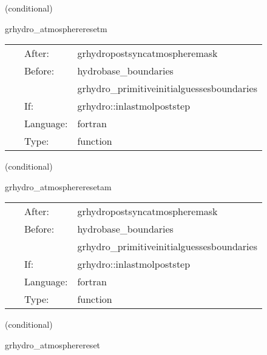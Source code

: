 \documentclass{article}
\begin{document}
   (conditional) 

\hspace{5mm} grhydro\_atmosphereresetm 

\hspace{5mm}{\it reset the atmosphere - mhd version } 


\hspace{5mm}

 \begin{tabular*}{160mm}{cll} 
~ & After:  & grhydropostsyncatmospheremask \\ 
~ & Before:  & hydrobase\_boundaries \\ 
~& ~ &grhydro\_primitiveinitialguessesboundaries\\ 
~ & If:  & grhydro::inlastmolpoststep \\ 
~ & Language:  & fortran \\ 
~ & Type:  & function \\ 
\end{tabular*} 


\vspace{5mm}

   (conditional) 

\hspace{5mm} grhydro\_atmosphereresetam 

\hspace{5mm}{\it reset the atmosphere - mhd with avec version } 


\hspace{5mm}

 \begin{tabular*}{160mm}{cll} 
~ & After:  & grhydropostsyncatmospheremask \\ 
~ & Before:  & hydrobase\_boundaries \\ 
~& ~ &grhydro\_primitiveinitialguessesboundaries\\ 
~ & If:  & grhydro::inlastmolpoststep \\ 
~ & Language:  & fortran \\ 
~ & Type:  & function \\ 
\end{tabular*} 


\vspace{5mm}

   (conditional) 

\hspace{5mm} grhydro\_atmospherereset 

\hspace{5mm}{\it reset the atmosphere } 
\end{document}
